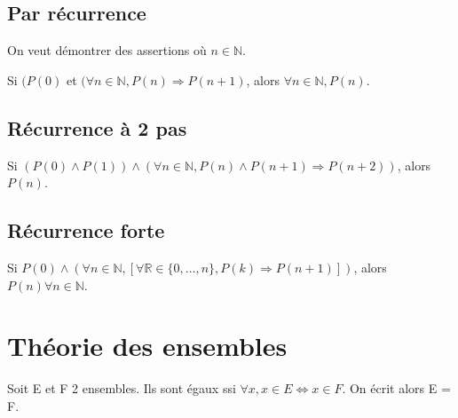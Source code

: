 \documentclass[french]{yLectureNote}
\begin{document}
\subsection{Par récurrence}
On veut démontrer des assertions où $n\in \mathbb{N}$.

\begin{theorem}[Proposition]
Si $(P(0)$ et $(\forall n\in \mathbb{N}, P(n) \Rightarrow P(n+1)$, alors $\forall n\in \mathbb{N}, P(n)$.
\end{theorem}

\subsection{Récurrence à 2 pas}
\begin{theorem}[Déf]
Si $(P(0)\wedge P(1)) \wedge (\forall n \in \mathbb{N}, P(n) \wedge P(n+1) \Rightarrow P(n+2))$, alors $P(n)$.
\end{theorem}
\subsection{Récurrence forte}
\begin{theorem}[définition]
Si $P(0) \wedge (\forall n \in \mathbb{N}, [\forall \mathbb{R} \in \{0,\dots,n\}, P(k) \Rightarrow P(n+1)])$, alors $P(n) \forall n \in \mathbb{N}$.
\end{theorem}
\section{Théorie des ensembles}
\begin{theorem}
Soit E et F 2 ensembles. Ils sont égaux ssi $\forall x, x \in E \iff x \in F$. On écrit alors E = F.
\end{theorem}
\end{document}
